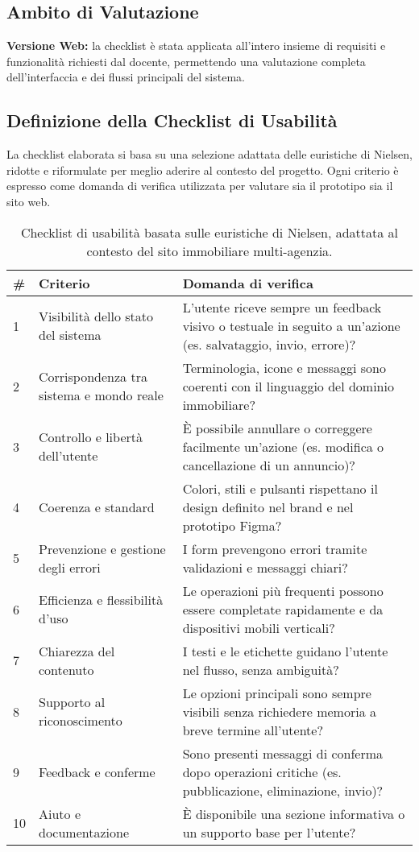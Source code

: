 \subsection*{Ambito di Valutazione}



\textbf{Versione Web:} la checklist è stata applicata all’intero insieme di requisiti e funzionalità richiesti dal docente, permettendo una valutazione completa dell’interfaccia e dei flussi principali del sistema.

\subsection*{Definizione della Checklist di Usabilità}

La checklist elaborata si basa su una selezione adattata delle euristiche di Nielsen, ridotte e riformulate per meglio aderire al contesto del progetto.  
Ogni criterio è espresso come domanda di verifica utilizzata per valutare sia il prototipo sia il sito web.

\begin{table}[h!]
\centering
\begin{tabular}{p{0.8cm} p{4cm} p{7cm}}
\hline
\textbf{\#} & \textbf{Criterio} & \textbf{Domanda di verifica} \\
\hline
1 & Visibilità dello stato del sistema & L’utente riceve sempre un feedback visivo o testuale in seguito a un’azione (es. salvataggio, invio, errore)? \\
2 & Corrispondenza tra sistema e mondo reale & Terminologia, icone e messaggi sono coerenti con il linguaggio del dominio immobiliare? \\
3 & Controllo e libertà dell’utente & È possibile annullare o correggere facilmente un’azione (es. modifica o cancellazione di un annuncio)? \\
4 & Coerenza e standard & Colori, stili e pulsanti rispettano il design definito nel brand e nel prototipo Figma? \\
5 & Prevenzione e gestione degli errori & I form prevengono errori tramite validazioni e messaggi chiari? \\
6 & Efficienza e flessibilità d’uso & Le operazioni più frequenti possono essere completate rapidamente e da dispositivi mobili verticali? \\
7 & Chiarezza del contenuto & I testi e le etichette guidano l’utente nel flusso, senza ambiguità? \\
8 & Supporto al riconoscimento & Le opzioni principali sono sempre visibili senza richiedere memoria a breve termine all’utente? \\
9 & Feedback e conferme & Sono presenti messaggi di conferma dopo operazioni critiche (es. pubblicazione, eliminazione, invio)? \\
10 & Aiuto e documentazione & È disponibile una sezione informativa o un supporto base per l’utente? \\
\hline
\end{tabular}
\caption{Checklist di usabilità basata sulle euristiche di Nielsen, adattata al contesto del sito immobiliare multi-agenzia.}
\label{tab:checklist_usabilita}
\end{table}

